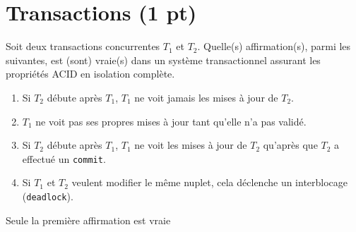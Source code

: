 \section{Transactions ({\bf 1 pt})}

Soit deux transactions concurrentes  $T_1$ et  $T_2$. Quelle(s) affirmation(s), parmi les suivantes, est (sont) vraie(s) 
dans un système transactionnel assurant les propriétés ACID
en isolation complète.

\begin{enumerate}
   \item  Si $T_2$  débute après $T_1$,
       $T_1$  ne voit jamais les  mises à jour de $T_2$.
   
   \item $T_1$  ne voit pas ses propres mises à jour tant qu'elle n'a pas validé.
   
  \item Si $T_2$  débute après $T_1$,
       $T_1$  ne voit les  mises à jour de $T_2$ qu'après  que $T_2$ a effectué un \texttt{commit}.

  \item Si  $T_1$  et $T_2$  veulent modifier le même nuplet,
       cela déclenche un interblocage (\texttt{deadlock}).
   
\end{enumerate}


\begin{solution}
Seule la première affirmation est vraie
\end{solution}

